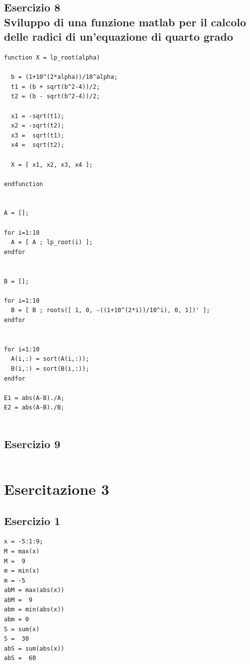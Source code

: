 \documentclass{article}
\begin{document}
\newpage
\subsection{ Esercizio 8 \\ Sviluppo di una funzione matlab per il calcolo delle radici di un'equazione di quarto grado}
\begin{lstlisting}
function X = lp_root(alpha)

  b = (1+10^(2*alpha))/10^alpha;
  t1 = (b + sqrt(b^2-4))/2;
  t2 = (b - sqrt(b^2-4))/2;

  x1 = -sqrt(t1);
  x2 = -sqrt(t2);
  x3 =  sqrt(t1);
  x4 =  sqrt(t2);

  X = [ x1, x2, x3, x4 ];

endfunction


A = [];

for i=1:10
  A = [ A ; lp_root(i) ];
endfor


B = [];

for i=1:10
  B = [ B ; roots([ 1, 0, -((1+10^(2*i))/10^i), 0, 1])' ];
endfor


for i=1:10
  A(i,:) = sort(A(i,:));
  B(i,:) = sort(B(i,:));
endfor

E1 = abs(A-B)./A;
E2 = abs(A-B)./B;


\end{lstlisting}



\newpage
\subsection{ Esercizio 9}
\begin{lstlisting}
\end{lstlisting}

\newpage
\section{ Esercitazione 3}


\subsection{ Esercizio 1}
\begin{lstlisting}
x = -5:1:9;
M = max(x)
M =  9
m = min(x)
m = -5
abM = max(abs(x))
abM =  9
abm = min(abs(x))
abm = 0
S = sum(x)
S =  30
abS = sum(abs(x))
abS =  60

\end{lstlisting}
\end{document}
